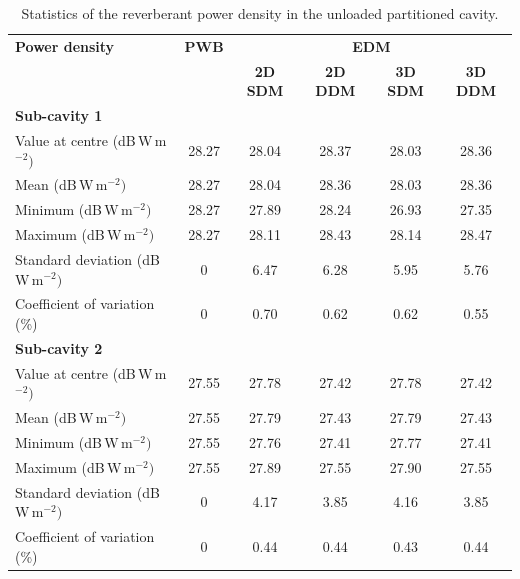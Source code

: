\documentclass[a4paper]{article}
\numberwithin{equation}{section}
\begin{document}
\begin{table}[h]
\begin{center}
\begin{tabular}{|l|c|c|c|c|c|}
\hline
\textbf{Power density}               &\textbf{PWB} &\multicolumn{4}{|c|}{\textbf{EDM}} \\ \cline{3-6}
{}                                   &{}           &\textbf{2D SDM} &\textbf{2D DDM} &\textbf{3D SDM} &\textbf{3D DDM} \\
\hline
\multicolumn{6}{|l|}{\textbf{Sub-cavity 1}} \\
\hline
Value at centre (dB\,W\,m$^{-2})$    &28.27        &28.04           &28.37           &28.03           &28.36 \\
Mean (dB\,W\,m$^{-2})$               &28.27        &28.04           &28.36           &28.03           &28.36 \\
Minimum (dB\,W\,m$^{-2})$            &28.27        &27.89           &28.24           &26.93           &27.35 \\
Maximum (dB\,W\,m$^{-2})$            &28.27        &28.11           &28.43           &28.14           &28.47 \\
Standard deviation (dB\,W\,m$^{-2})$ &0            &6.47            &6.28            &5.95            &5.76  \\
Coefficient of variation (\%)        &0            &0.70            &0.62            &0.62            &0.55  \\
\hline
\multicolumn{6}{|l|}{\textbf{Sub-cavity 2}} \\
\hline
Value at centre (dB\,W\,m$^{-2})$    &27.55        &27.78           &27.42           &27.78           &27.42 \\
Mean (dB\,W\,m$^{-2})$               &27.55        &27.79           &27.43           &27.79           &27.43 \\
Minimum (dB\,W\,m$^{-2})$            &27.55        &27.76           &27.41           &27.77           &27.41 \\
Maximum (dB\,W\,m$^{-2})$            &27.55        &27.89           &27.55           &27.90           &27.55 \\
Standard deviation (dB\,W\,m$^{-2})$ &0            &4.17            &3.85            &4.16            &3.85  \\
Coefficient of variation (\%)        &0            &0.44            &0.44            &0.43            &0.44  \\
\hline
\end{tabular}
\end{center}
\caption{\label{tb:partempty} Statistics of the reverberant power density in the unloaded partitioned cavity.}
\end{table}
\end{document}
